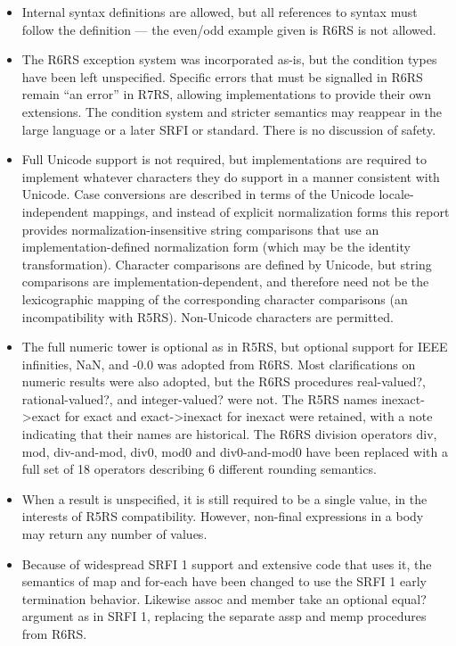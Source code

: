 \begin{itemize}
\item Internal syntax definitions are allowed, but all references to syntax
must follow the definition --- the {\cf even}/{\cf odd} example given is
R6RS is not allowed.

\item The R6RS exception system was incorporated as-is, but the condition
types have been left unspecified. Specific errors that must be signalled
in R6RS remain ``an error'' in R7RS, allowing implementations to provide
their own extensions.  The condition system and stricter semantics may
reappear in the large language or a later SRFI or standard. There is no
discussion of safety.

\item Full Unicode support is not required, but implementations are required to
implement whatever characters they do support in a manner
consistent with Unicode.  Case
conversions are described in terms of the Unicode locale-independent
mappings, and instead of explicit normalization forms this report provides
normalization-insensitive string comparisons that use
an implementation-defined normalization form
(which may be the identity transformation). Character comparisons are
defined by Unicode, but string comparisons are implementation-dependent,
and therefore need not be the lexicographic mapping of the corresponding
character comparisons (an incompatibility with R5RS). Non-Unicode
characters are permitted.

\item The full numeric tower is optional as in R5RS, but optional support for IEEE
infinities, NaN, and -0.0 was adopted from R6RS. Most clarifications on
numeric results were also adopted, but the R6RS procedures {\cf real-valued?},
{\cf rational-valued?}, and {\cf integer-valued}? were not. The R5RS names
{\cf inexact->exact} for {\cf exact} and {\cf exact->inexact} for {\cf inexact} were retained,
with a note indicating that their names are historical.
The R6RS division operators {\cf div}, {\cf mod}, {\cf div-and-mod}, {\cf
div0}, {\cf mod0} and {\cf div0-and-mod0} have been replaced with a full
set of 18 operators describing 6 different rounding semantics.

\item When a result is unspecified, it is still required to be a single value,
in the interests of R5RS compatibility. However, non-final expressions
in a body may return any number of values.

\item Because of widespread SRFI 1 support and extensive code
that uses it, the semantics of {\cf map} and {\cf for-each} have been changed to use
the SRFI 1 early termination behavior. Likewise
{\cf assoc} and {\cf member} take an optional {\cf equal?} argument as in SRFI 1,
replacing the separate {\cf assp} and {\cf memp} procedures from R6RS.


\end{itemize}

